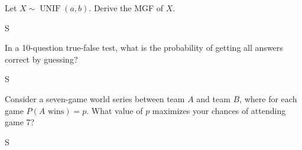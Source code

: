 \documentclass[answers]{exam}
\begin{document}
\begin{questions}
\question 
Let \(X\sim\operatorname{UNIF}(a,b)\). Derive the MGF of $X$.
\begin{solution}
	S
\end{solution}

\question 
In a 10-question true-false test, what is the probability of getting all answers correct by guessing?
\begin{solution}
	S
\end{solution}

\question 
Consider a seven-game world series between team $A$ and team $B$, where for each game \(P(A\text{ wins})=p\). What value of $p$ maximizes your chances of attending game 7?
\begin{solution}
	S
\end{solution}

\end{questions}
\end{document}
